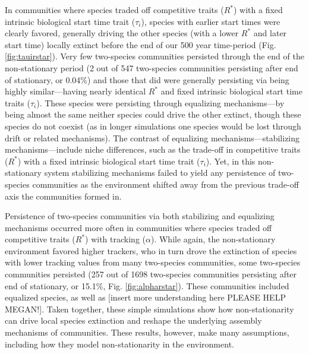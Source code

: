 \documentclass[11pt,letterpaper]{article}
\begin{document}
In communities where species traded off competitive traits ($R^*$) with a fixed intrinsic biological start time trait ($\tau_i$), species with earlier start times were clearly favored, generally driving the other species (with a lower $R^*$ and later start time) locally extinct before the end of our 500 year time-period (Fig. \ref{fig:tauirstar}). Very few two-species communities persisted through the end of the non-stationary period (2 out of 547 two-species communities persisting after end of stationary, or 0.04\%) and those that did were generally persisting via being highly similar---having nearly identical $R^*$ and fixed intrinsic biological start time traits ($\tau_i$). These species were persisting through equalizing mechanisms---by being almost the same neither species could drive the other extinct, though these species do not coexist (as in longer simulations one species would be lost through drift or related mechanisms). The contrast of equalizing mechanisms---stabilizing mechanisms---include niche differences, such as the trade-off in competitive traits ($R^*$) with a fixed intrinsic biological start time trait ($\tau_i$). Yet, in this non-stationary system stabilizing mechanisms failed to yield any persistence of two-species communities as the environment shifted away from the previous trade-off axis the communities formed in. 

Persistence of two-species communities via both stabilizing and equalizing mechanisms occurred more often in communities where species traded off competitive traits ($R^*$) with tracking ($\alpha$). While again, the non-stationary environment favored higher trackers, who in turn drove the extinction of species with lower tracking values from many two-species communities, some two-species communities persisted (257 out of 1698 two-species communities persisting after end of stationary, or 15.1\%, Fig. \ref{fig:alpharstar}). These communities included equalized species, as well as [insert more understanding here PLEASE HELP MEGAN!]. Taken together, these simple simulations show how non-stationarity can drive local species extinction and reshape the underlying assembly mechanisms of communities. These results, however, make many assumptions, including how they model non-stationarity in the environment. 
\end{document}
